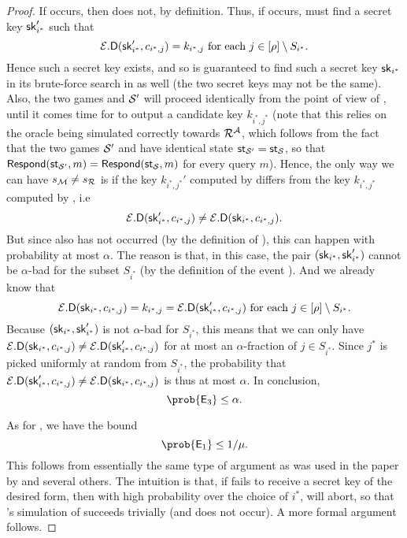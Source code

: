 \begin{proof}
  If  occurs, then  does not, by definition.
  Thus, if  occurs, \redM must find a secret key \(\mathsf{sk}_{i^{*}}'\) such that
  \[
  \mathcal{E}.\mathsf{D}(\mathsf{sk}_{i^{*}}',c_{i^{*},j}) = k_{i^{*},j} \text{ for each } j \in [\rho] \setminus S_{i^{*}}.
  \]
  Hence such a secret key exists, and so \advA is guaranteed to find such a secret key \(\mathsf{sk}_{i^{*}}\)
  in its brute-force search in \Simple as well (the two secret keys may not be the same).
  Also, the two games \Simple and \(\mathcal{S}'\) will proceed identically from the point of view of \redR,
  until it comes time for \advA to output a candidate key \(k_{i^{*},j^{*}}\)
  (note that this relies on the oracle \oracle being simulated correctly towards \(\redR^{\advA}\),
  which follows from the fact that the two games \(\mathcal{S}'\) and \Simple
  have identical state \(\mathsf{st}_{\mathcal{S}'} = \mathsf{st}_{\mathcal{S}}\),
  so that \(\mathsf{Respond}(\mathsf{st}_{\mathcal{S}'},m) = \mathsf{Respond}(\mathsf{st}_{\mathcal{S}},m)\) for every query \(m\)).
  Hence, the only way we can have \(s_{\redM} \ne s_{\redR}\)
  is if the key \(k_{i^{*},j^{*}}'\) computed by \redM differs from the key \(k_{i^{*},j^{*}}\) computed by \advA,
  i.e
  \[
    \mathcal{E}.\mathsf{D}(\mathsf{sk}_{i^{*}}',c_{i^{*},j}) \ne \mathcal{E}.\mathsf{D}(\mathsf{sk}_{i^{*}},c_{i^{*},j}).
  \]
  But since  also has not occurred (by the definition of ),
  this can happen with probability at most \(\alpha\).
  The reason is that, in this case, the pair \((\mathsf{sk}_{i^{*}},\mathsf{sk}_{i^{*}}')\) cannot be
  \(\alpha\)-bad for the subset \(S_{i^{*}}\)
  (by the definition of the event ).
  And we already know that
  \[
  \mathcal{E}.\mathsf{D}(\mathsf{sk}_{i^{*}},c_{i^{*},j}) = k_{i^{*},j} = \mathcal{E}.\mathsf{D}(\mathsf{sk}_{i^{*}}',c_{i^{*},j}) \text{ for each } j \in [\rho] \setminus S_{i^{*}}.
  \]
  Because \((\mathsf{sk}_{i^{*}}, \mathsf{sk}_{i^{*}}')\) is not \(\alpha\)-bad for \(S_{i^{*}}\),
  this means that we can only have
  \(\mathcal{E}.\mathsf{D}(\mathsf{sk}_{i^{*}},c_{i^{*},j}) \ne \mathcal{E}.\mathsf{D}(\mathsf{sk}_{i^{*}}',c_{i^{*},j})\)
  for at most an \(\alpha\)-fraction of \(j \in S_{i^{*}}\).
  Since \(j^{*}\) is picked uniformly at random from \(S_{i^{*}}\), the probability that
  \(\mathcal{E}.\mathsf{D}(\mathsf{sk}_{i^{*}}',c_{i^{*},j}) \ne \mathcal{E}.\mathsf{D}(\mathsf{sk}_{i^{*}},c_{i^{*},j})\)
  is thus at most \(\alpha\).
  In conclusion,
  \[
    \prob{\eventi{3}} \le \alpha.
  \]

  As for , we have the bound
  \[
    \prob{\eventi{1}} \le 1/\mu.
  \]
  This follows from essentially the same type of argument as was used in the paper by \cite{EC:BJLS16} and several others.
  The intuition is that, if \redM fails to receive a secret key of the desired form,
  then with high probability over the choice of \(i^{*}\), \advA{} will abort,
  so that \redM's simulation of \advA succeeds trivially (and  does not occur).
  A more formal argument follows.


\end{proof}
